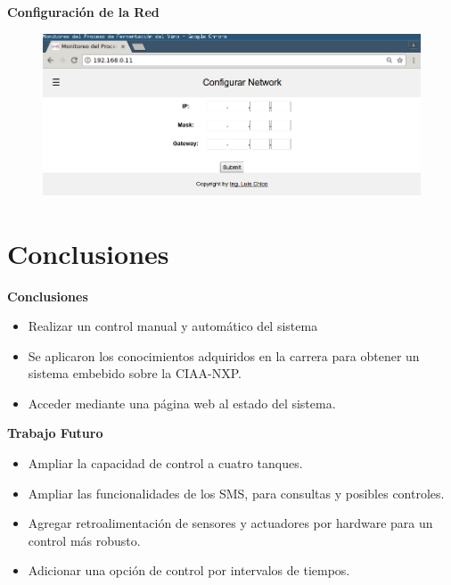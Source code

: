 \documentclass[11pt]{beamer}
\begin{document}
\begin{frame}{\textbf{\LARGE{Configuración de la Red}}}
  \vspace{-.7cm}
  \begin{figure}[H]
    {\includegraphics[width=1\textwidth]{./imagenes/config_network.png}}
  \end{figure}	
\end{frame}

\section{Conclusiones}

\begin{frame}{\textbf{\LARGE{Conclusiones}}}
  \fontsize{16pt}{16}\selectfont
  \begin{itemize}
    \item Realizar un control manual y automático del sistema
      \vspace{10px}
    \item Se aplicaron los conocimientos adquiridos en la carrera para obtener un sistema embebido sobre la CIAA-NXP.
      \vspace{10px}
    \item Acceder mediante una página web al estado del sistema.
  \end{itemize}
\end{frame}

\begin{frame}{\textbf{\LARGE{Trabajo Futuro}}}
  \fontsize{16pt}{16}\selectfont
  \begin{itemize}
    \item Ampliar la capacidad de control a cuatro tanques.
      \vspace{15px}
    \item Ampliar las funcionalidades de los SMS, para consultas y posibles controles. 
      \vspace{15px}
    \item Agregar retroalimentación de sensores y actuadores por hardware para un control más robusto.
      \vspace{15px}
    \item Adicionar una opción de control por intervalos de tiempos. 
  \end{itemize}
\end{frame}
\end{document}

